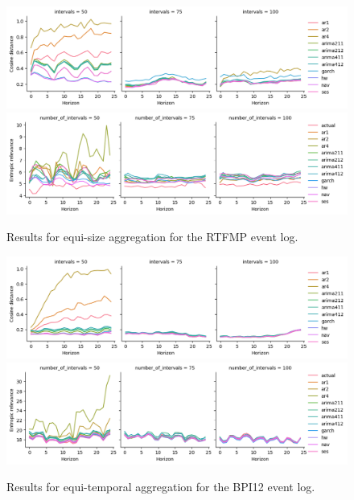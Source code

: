 \begin{figure}
    \centering
    \includegraphics[width=\textwidth]{img/rtfmp_cosine_equisize.png}
    \includegraphics[width=\textwidth]{img/rtfmp_entropic_equisize.png}
    \caption{Results for equi-size aggregation for the RTFMP event log.}
    \label{fig:rtfmp_equisize}
\end{figure}

\begin{figure}
    \centering
    \includegraphics[width=\textwidth]{img/bpi12_cosine_equitemp.png}
    \includegraphics[width=\textwidth]{img/bpi12_entropic_equitemp.png}
    \caption{Results for equi-temporal aggregation for the BPI12 event log.}
    \label{fig:bpi12_equitemp}
\end{figure}

